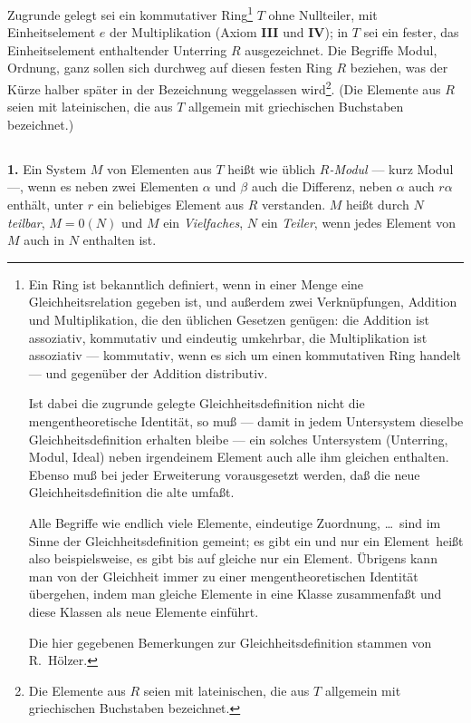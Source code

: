 \documentclass[12pt,a4paper]{article}
\theoremstyle{plain}
\theoremstyle{definition}
\theoremstyle{remark}
\begin{document}
\noindent
Zugrunde gelegt sei ein kommutativer Ring\footnote{Ein Ring ist bekanntlich definiert, wenn in einer Menge eine Gleichheitsrelation gegeben ist, und außerdem zwei Verknüpfungen, Addition und Multiplikation, die den üblichen Gesetzen genügen: die Addition ist assoziativ, kommutativ und eindeutig umkehrbar, die Multiplikation ist assoziativ --- kommutativ, wenn es sich um einen kommutativen Ring handelt --- und gegenüber der Addition distributiv.

Ist dabei die zugrunde gelegte Gleichheitsdefinition nicht die mengentheoretische Identität, so muß --- damit in jedem Untersystem dieselbe Gleichheitsdefinition erhalten bleibe --- ein solches Untersystem (Unterring, Modul, Ideal) neben irgendeinem Element auch alle ihm gleichen enthalten. Ebenso muß bei jeder Erweiterung vorausgesetzt werden, daß die neue Gleichheitsdefinition die alte umfaßt.

Alle Begriffe wie \glqq endlich viele Elemente\grqq, \glqq eindeutige Zuordnung\grqq, \dots\ sind im Sinne der Gleichheitsdefinition gemeint; es gibt \glqq ein und nur ein Element\grqq\ heißt also beispielsweise, es gibt bis auf gleiche nur ein Element. Übrigens kann man von der Gleichheit immer zu einer mengentheoretischen Identität übergehen, indem man gleiche Elemente in eine Klasse zusammenfaßt und diese Klassen als neue Elemente einführt.

Die hier gegebenen Bemerkungen zur Gleichheitsdefinition stammen von R.~Hölzer.} $T$ ohne Nullteiler, mit Einheitselement $e$ der Multiplikation (Axiom \textbf{III} und \textbf{IV}); in $T$ sei ein fester, das Einheitselement enthaltender Unterring $R$ ausgezeichnet. Die Begriffe Modul, Ordnung, ganz sollen sich durchweg auf diesen festen Ring $R$ beziehen, was der Kürze halber später in der Bezeichnung weggelassen wird\footnote{Die Elemente aus $R$ seien mit lateinischen, die aus $T$ allgemein mit griechischen Buchstaben bezeichnet.}. (Die Elemente aus $R$ seien mit lateinischen, die aus $T$ allgemein mit griechischen Buchstaben bezeichnet.)

\setcounter{Satz}{0}
\subsection{}

\noindent
\textbf{1.} Ein System $M$ von Elementen aus $T$ heißt wie üblich \textit{$R$-Modul} --- kurz Modul ---, wenn es neben zwei Elementen $\alpha$ und $\beta$ auch die Differenz, neben $\alpha$ auch $r\alpha$ enthält, unter $r$ ein beliebiges Element aus $R$ verstanden. $M$ heißt durch $N$ \textit{teilbar}, $M = 0(N)$ und $M$ ein \textit{Vielfaches}, $N$ ein \textit{Teiler}, wenn jedes Element von $M$ auch in $N$ enthalten ist.
\end{document}
